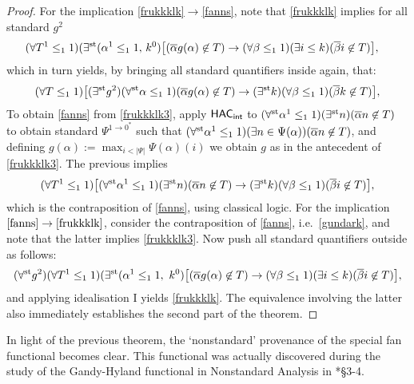 \documentclass[reqno]{amsart}
\newcommand\be{\begin{equation}}
\newcommand\ee{\end{equation}}
\def\st{\textup{st}}
\def\di{\rightarrow}
\def\HAC{\textup{\textsf{HAC}}}
\def\INT{\textup{\textsf{int}}}
\numberwithin{equation}{section}
\numberwithin{thm}{section}
\begin{document}
\begin{proof}
For the implication \eqref{frukkklk}$\di$\eqref{fanns}, note that \eqref{frukkklk} implies for all standard $g^{2}$
\begin{align}\label{frukkklk2}
(\forall T^{1}\leq_{1}1)(\exists^{\st} ( \alpha^{1}\leq_{1}1,  &~k^{0})\big[(\overline{\alpha}g(\alpha)\not\in T)
\di(\forall \beta\leq_{1}1)(\exists i\leq k)(\overline{\beta}i\not\in T) \big], 
\end{align}  
which in turn yields, by bringing all standard quantifiers inside again, that:
\begin{align}\label{frukkklk3}
(\forall T\leq_{1}1) \big[(\exists^{\st}g^{2})(\forall^{\st}\alpha \leq_{1}1)(\overline{\alpha}g(\alpha)\not\in T)\di(\exists^{\st}k)(\forall \beta\leq_{1}1)(\overline{\beta}k\not\in T) \big], 
\end{align}  
To obtain \eqref{fanns} from \eqref{frukkklk3}, apply $\HAC_{\INT}$ to $(\forall^{\st}\alpha^{1}\leq_{1}1)(\exists^{\st}n)(\overline{\alpha}n\not\in T)$ to obtain standard $\Psi^{1\di 0^{*}}$ such that  
$(\forall^{\st}\alpha^{1}\leq_{1}1)(\exists n\in \Psi(\alpha))(\overline{\alpha}n\not\in T)$, and defining $g(\alpha):=\max_{i<|\Psi|}\Psi(\alpha)(i)$ we obtain $g$ as in the antecedent of \eqref{frukkklk3}.  The previous implies 
\be\label{gundark}
(\forall T^{1}\leq_{1}1) \big[(\forall^{\st}\alpha^{1}\leq_{1}1)(\exists^{\st}n)(\overline{\alpha}n\not\in T)\di (\exists^{\st}k)(\forall \beta\leq_{1}1)(\overline{\beta}i\not\in T) \big], 
\ee
which is the contraposition of \eqref{fanns}, using classical logic.  For the implication $\eqref{fanns}  \di \eqref{frukkklk}$, consider the contraposition of \eqref{fanns}, i.e.\ \eqref{gundark}, and note that the latter implies \eqref{frukkklk3}.  Now push all standard quantifiers outside as follows:
\[
(\forall^{\st}g^{2})(\forall T^{1}\leq_{1}1)(\exists^{\st} ( \alpha^{1}\leq_{1}1, ~k^{0})\big[(\overline{\alpha}g(\alpha)\not\in T)
\di(\forall \beta\leq_{1}1)(\exists i\leq k)(\overline{\beta}i\not\in T) \big], 
\]
and applying idealisation \textsf{I} yields \eqref{frukkklk}.  The equivalence involving the latter also immediately establishes the second part of the theorem.    
\end{proof}
In light of the previous theorem, the `nonstandard' provenance of the special fan functional becomes clear.  This functional was actually discovered during the study of the Gandy-Hyland functional in Nonstandard Analysis in \cite{samGH}*{\S3-4}.  

\medskip
\end{document}
